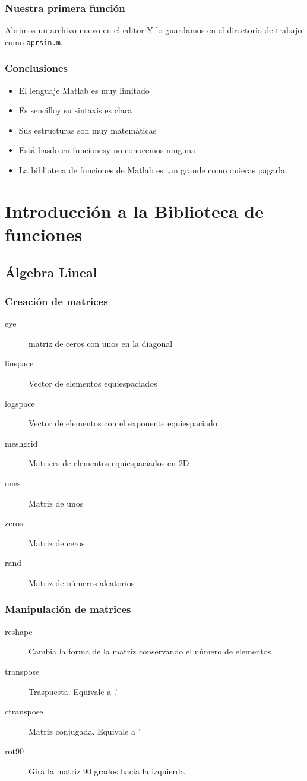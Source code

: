 \documentclass[12pt]{beamer}
\begin{document}
\begin{frame}
  \frametitle{Nuestra primera función}
Abrimos un archivo nuevo en el editor
\testcode
Y lo guardamos en el directorio de trabajo como \texttt{aprsin.m}.
\end{frame}


\begin{frame}
\frametitle{Conclusiones}
\begin{itemize}
\item El lenguaje Matlab es muy limitado
\item Es sencilloy su sintaxis es clara
\item Sus estructuras son muy matemáticas
\item Está basdo en funcionesy no conocemos ninguna
\item La biblioteca de funciones de Matlab es tan grande como quieras
  pagarla.
\end{itemize}
\end{frame}

\section{Introducción a la Biblioteca de funciones}

\subsection{Álgebra Lineal}
\begin{frame}
\frametitle{Creación de matrices}
\begin{description}
\item[eye] matriz de ceros con unos en la diagonal
\item[linspace] Vector de elementos equiespaciados
\item[logspace] Vector de elementos con el exponente equiespaciado
\item[meshgrid] Matrices de elementos equiespaciados en 2D
\item[ones] Matriz de unos
\item[zeros] Matriz de ceros
\item[rand] Matriz de números aleatorios
\end{description}
\end{frame}

\begin{frame}
\frametitle{Manipulación de matrices}
\begin{description}
\item[reshape] Cambia la forma de la matriz conservando el número de
  elementos
\item[transpose] Traspuesta. Equivale a .'
\item[ctranspose] Matriz conjugada. Equivale a '
\item[rot90] Gira la matriz 90 grados hacia la izquierda
\end{description}
\end{frame}
\end{document}
